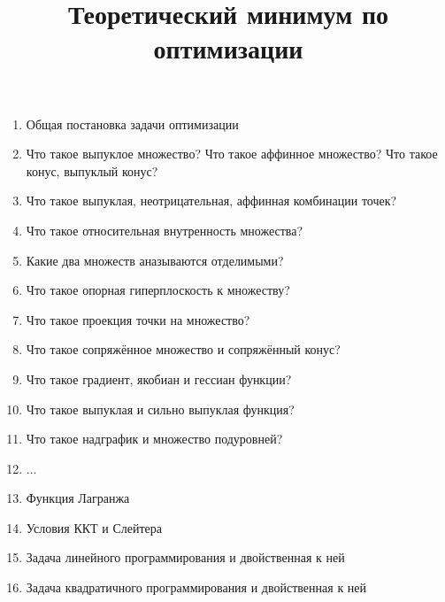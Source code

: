 \documentclass[12pt]{article}
\begin{document}
\title{Теоретический минимум по оптимизации}
\author{}
\date{}

\maketitle
\vspace{-2cm}
\begin{enumerate}
\item Общая постановка задачи оптимизации
\item Что такое выпуклое множество? Что такое аффинное множество? Что такое конус, выпуклый конус?
\item Что такое выпуклая, неотрицательная, аффинная комбинации точек?
\item Что такое относительная внутренность множества?
\item Какие два множеств аназываются отделимыми?
\item Что такое опорная гиперплоскость к множеству?
\item Что такое проекция точки на множество?
\item Что такое сопряжённое множество и сопряжённый конус?
\item Что такое градиент, якобиан и гессиан функции?
\item Что такое выпуклая и сильно выпуклая функция?
\item Что такое надграфик и множество подуровней?
\item ...
\item Функция Лагранжа
\item Условия ККТ и Слейтера
\item Задача линейного программирования и двойственная к ней
\item Задача квадратичного программирования и двойственная к ней

\end{enumerate}
\end{document}
